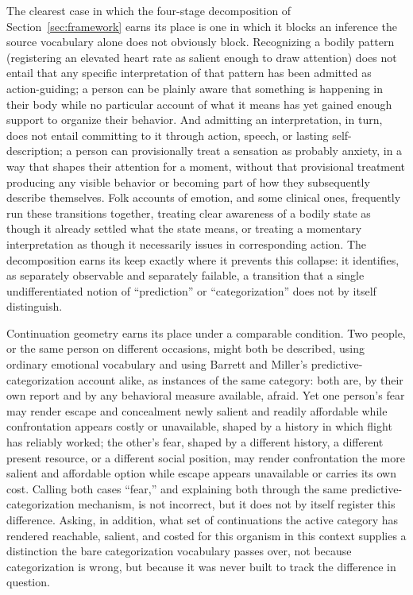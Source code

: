 \documentclass[11pt]{article}
\begin{document}
The clearest case in which the four-stage decomposition of Section~\ref{sec:framework} earns its place is one in which it blocks an inference the source vocabulary alone does not obviously block. Recognizing a bodily pattern (registering an elevated heart rate as salient enough to draw attention) does not entail that any specific interpretation of that pattern has been admitted as action-guiding; a person can be plainly aware that something is happening in their body while no particular account of what it means has yet gained enough support to organize their behavior. And admitting an interpretation, in turn, does not entail committing to it through action, speech, or lasting self-description; a person can provisionally treat a sensation as probably anxiety, in a way that shapes their attention for a moment, without that provisional treatment producing any visible behavior or becoming part of how they subsequently describe themselves. Folk accounts of emotion, and some clinical ones, frequently run these transitions together, treating clear awareness of a bodily state as though it already settled what the state means, or treating a momentary interpretation as though it necessarily issues in corresponding action. The decomposition earns its keep exactly where it prevents this collapse: it identifies, as separately observable and separately failable, a transition that a single undifferentiated notion of ``prediction'' or ``categorization'' does not by itself distinguish.

Continuation geometry earns its place under a comparable condition. Two people, or the same person on different occasions, might both be described, using ordinary emotional vocabulary and using Barrett and Miller's predictive-categorization account alike, as instances of the same category: both are, by their own report and by any behavioral measure available, afraid. Yet one person's fear may render escape and concealment newly salient and readily affordable while confrontation appears costly or unavailable, shaped by a history in which flight has reliably worked; the other's fear, shaped by a different history, a different present resource, or a different social position, may render confrontation the more salient and affordable option while escape appears unavailable or carries its own cost. Calling both cases ``fear,'' and explaining both through the same predictive-categorization mechanism, is not incorrect, but it does not by itself register this difference. Asking, in addition, what set of continuations the active category has rendered reachable, salient, and costed for this organism in this context supplies a distinction the bare categorization vocabulary passes over, not because categorization is wrong, but because it was never built to track the difference in question.
\end{document}
